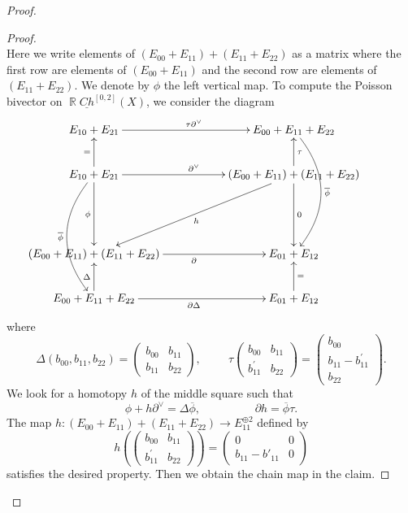 \documentclass[reqno]{amsart}
\DeclareMathOperator\R{\mathbb R}
\theoremstyle{definition}
\theoremstyle{remark}
\newcommand{\ol}{\overline}
\newcommand{\uchain}{\underline{Ch}}
\numberwithin{equation}{section}
\begin{document}
\begin{proof}
\begin{proof}
\[{}
\]
Here we write elements of $(E_{00}+E_{11})+(E_{11}+E_{22})$ as a matrix where the first row are elements of $(E_{00}+E_{11})$ and the second row are elements of $(E_{11}+E_{22})$.
We denote by $\phi$ the left vertical map. To compute the Poisson bivector on $\R\uchain^{[0,2]}(X)$, we consider the diagram
\begin{equation}\label{CD:poissonch}
\xymatrix{
E_{10}+ E_{21}\ar[rr] ^{\tau\partial^\vee} && E_{00}+E_{11}+E_{22} \ar@/^2.0pc/[ddd]^{\ol{\phi}} \\ 
E_{10}+ E_{21}\ar[rr]^{\partial^\vee} \ar[u]^=  \ar[dd]_{\phi}\ar@/_2.0pc/[ddd]_{\ol{\phi}} && (E_{00}+E_{11})+(E_{11}+E_{22})\ar[dd]^0\ar[u]_{\tau}\ar[lldd]^h \\ 
& & & \\
(E_{00}+E_{11})+(E_{11}+E_{22})\ar[rr]_{\partial}&& E_{01}+E_{12}\\
E_{00}+E_{11}+E_{22}\ar[rr]_{\partial\Delta}\ar[u]^\Delta& & E_{01}+E_{12}\ar[u]_{=}
}
\end{equation}
where 
\[\Delta(b_{00},b_{11},b_{22})=\left(\begin{array}{cc} b_{00} & b_{11}\\ b_{11} & b_{22}\end{array}\right),
\hspace{1cm}
\tau\left(\begin{array}{cc} b_{00} & b_{11}\\ b^\prime_{11} & b_{22}\end{array}\right)=\left(\begin{array}{ccc} b_{00}\\ b_{11}-b^\prime_{11} \\ b_{22}\end{array}\right).
\] 
We look for a homotopy $h$ of the middle square such that 
\[
\phi+h\partial^\vee=\Delta\ol{\phi},\hspace{2cm} \partial h=\ol{\phi}\tau.
\]
The map $h: (E_{00}+E_{11})+
(E_{11}+E_{22})\to E_{11}^{\oplus 2}$ defined by 
\[
h(\left(\begin{array}{cc} b_{00} & b_{11}\\ b^\prime_{11} & b_{22}\end{array}\right))=\left(\begin{array}{cc} 0 & 0\\ b_{11}-b'_{11} & 0\end{array}\right)
\] satisfies the desired property.  Then we obtain the chain map in the claim.
\end{proof}


\end{proof}
\end{document}
